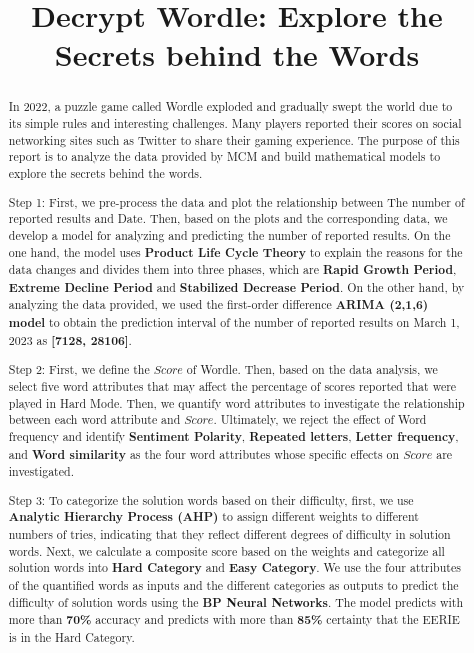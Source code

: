 \documentclass[12pt]{article}  %
\title{Decrypt Wordle: Explore the Secrets behind the Words}  %
\begin{document}
\begin{abstract}
	In 2022, a puzzle game called Wordle exploded and gradually swept the world due to its simple rules and interesting challenges. Many players reported their scores on social networking sites such as Twitter to share their gaming experience. The purpose of this report is to analyze the data provided by MCM and build mathematical models to explore the secrets behind the words.
	
	Step 1: First, we pre-process the data and plot the relationship between The number of reported results and Date. Then, based on the plots and the corresponding data, we develop a model for analyzing and predicting the number of reported results. On the one hand, the model uses \textbf{Product Life Cycle Theory} to explain the reasons for the data changes and divides them into three phases, which are \textbf{Rapid Growth Period}, \textbf{Extreme Decline Period} and \textbf{Stabilized Decrease Period}. On the other hand, by analyzing the data provided, we used the first-order difference \textbf{ARIMA (2,1,6) model} to obtain the prediction interval of the number of reported results on March 1, 2023 as \textbf{[7128, 28106]}.
	
	Step 2: First, we define the $Score$ of Wordle. Then, based on the data analysis, we select five word attributes that may affect the percentage of scores reported that were played in Hard Mode. Then, we quantify word attributes to investigate the relationship between each word attribute and $Score$. Ultimately, we reject the effect of Word frequency and identify \textbf{Sentiment Polarity}, \textbf{Repeated letters}, \textbf{Letter frequency}, and \textbf{Word similarity} as the four word attributes whose specific effects on $Score$ are investigated.
	
	Step 3: To categorize the solution words based on their difficulty, first, we use \textbf{Analytic Hierarchy Process (AHP)} to assign different weights to different numbers of tries, indicating that they reflect different degrees of difficulty in solution words. Next, we calculate a composite score based on the weights and categorize all solution words into \textbf{Hard Category} and \textbf{Easy Category}. We use the four attributes of the quantified words as inputs and the different categories as outputs to predict the difficulty of solution words using the \textbf{BP Neural Networks}. The model predicts with more than \textbf{70\%} accuracy and predicts with more than \textbf{85\%} certainty that the EERIE is in the Hard Category.
	

\end{abstract}
\end{document}
